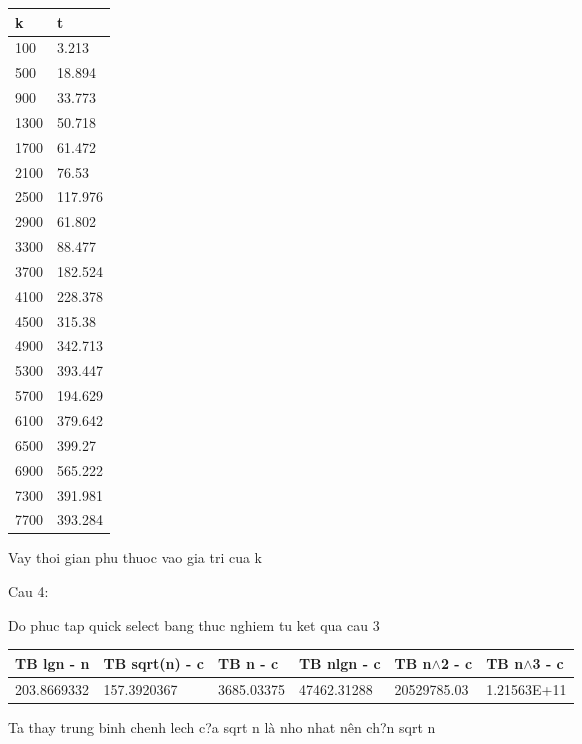 \documentclass{article}
\begin{document}
\begin{tabular}{|p{0.5in}|p{0.5in}|} \hline 
k & t \\ \hline 
100 & 3.213 \\ \hline 
500 & 18.894 \\ \hline 
900 & 33.773 \\ \hline 
1300 & 50.718 \\ \hline 
1700 & 61.472 \\ \hline 
2100 & 76.53 \\ \hline 
2500 & 117.976 \\ \hline 
2900 & 61.802 \\ \hline 
3300 & 88.477 \\ \hline 
3700 & 182.524 \\ \hline 
4100 & 228.378 \\ \hline 
4500 & 315.38 \\ \hline 
4900 & 342.713 \\ \hline 
5300 & 393.447 \\ \hline 
5700 & 194.629 \\ \hline 
6100 & 379.642 \\ \hline 
6500 & 399.27 \\ \hline 
6900 & 565.222 \\ \hline 
7300 & 391.981 \\ \hline 
7700 & 393.284 \\ \hline 
\end{tabular}



\noindent Vay thoi gian phu thuoc vao gia tri cua k

\noindent 

\noindent Cau 4:

\noindent Do phuc tap quick select bang thuc nghiem tu ket qua cau 3

\begin{tabular}{|p{0.7in}|p{0.7in}|p{0.7in}|p{0.7in}|p{0.7in}|p{0.7in}|} \hline 
TB lgn - n & TB sqrt(n) - c & TB n - c & TB nlgn - c & TB n$\mathrm{\wedge}$2 - c & TB  n$\mathrm{\wedge}$3 - c \\ \hline 
203.8669332 & 157.3920367 & 3685.03375 & 47462.31288 & 20529785.03 & 1.21563E+11 \\ \hline 
\end{tabular}



\noindent Ta thay trung binh chenh lech c?a sqrt n l\`{a} nho nhat n\^{e}n ch?n sqrt n

\noindent 
\end{document}
